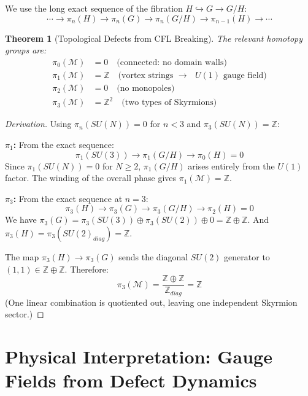 \documentclass[12pt]{article}
\newtheorem{theorem}{Theorem}
\begin{document}
We use the long exact sequence of the fibration $H \hookrightarrow G \to G/H$:
\begin{equation}
    \cdots \to \pi_n(H) \to \pi_n(G) \to \pi_n(G/H) \to \pi_{n-1}(H) \to \cdots
\end{equation}

\begin{theorem}[Topological Defects from CFL Breaking]
The relevant homotopy groups are:
\begin{align}
    \pi_0(\mathcal{M}) &= 0 \quad \text{(connected: no domain walls)} \\
    \pi_1(\mathcal{M}) &= \mathbb{Z} \quad \text{(vortex strings $\to$ $U(1)$ gauge field)} \\
    \pi_2(\mathcal{M}) &= 0 \quad \text{(no monopoles)} \\
    \pi_3(\mathcal{M}) &= \mathbb{Z}^2 \quad \text{(two types of Skyrmions)}
\end{align}
\end{theorem}

\begin{proof}[Derivation]
Using $\pi_n(SU(N)) = 0$ for $n < 3$ and $\pi_3(SU(N)) = \mathbb{Z}$:

\textbf{$\pi_1$:} From the exact sequence:
\begin{equation}
    \pi_1(SU(3)) \to \pi_1(G/H) \to \pi_0(H) = 0
\end{equation}
Since $\pi_1(SU(N)) = 0$ for $N \geq 2$, $\pi_1(G/H)$ arises entirely from the $U(1)$ factor. The winding of the overall phase gives $\pi_1(\mathcal{M}) = \mathbb{Z}$.

\textbf{$\pi_3$:} From the exact sequence at $n=3$:
\begin{equation}
    \pi_3(H) \to \pi_3(G) \to \pi_3(G/H) \to \pi_2(H) = 0
\end{equation}
We have $\pi_3(G) = \pi_3(SU(3)) \oplus \pi_3(SU(2)) \oplus 0 = \mathbb{Z} \oplus \mathbb{Z}$.
And $\pi_3(H) = \pi_3(SU(2)_{diag}) = \mathbb{Z}$.

The map $\pi_3(H) \to \pi_3(G)$ sends the diagonal $SU(2)$ generator to $(1, 1) \in \mathbb{Z} \oplus \mathbb{Z}$. Therefore:
\begin{equation}
    \pi_3(\mathcal{M}) = \frac{\mathbb{Z} \oplus \mathbb{Z}}{\mathbb{Z}_{diag}} = \mathbb{Z}
\end{equation}
(One linear combination is quotiented out, leaving one independent Skyrmion sector.)
\end{proof}

\section{Physical Interpretation: Gauge Fields from Defect Dynamics}
\end{document}
